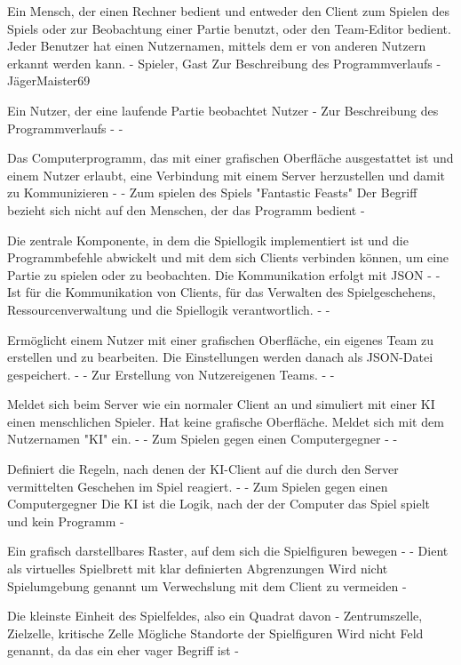 {Ein Mensch, der einen Rechner bedient und entweder den Client zum Spielen des Spiels oder zur Beobachtung einer Partie benutzt, oder den Team-Editor bedient. Jeder Benutzer hat einen Nutzernamen, mittels dem er von anderen Nutzern erkannt werden kann.}
{-}
{Spieler, Gast}
{Zur Beschreibung des Programmverlaufs}
{-}
{JägerMaister69}

{Ein Nutzer, der eine laufende Partie beobachtet}
{Nutzer}
{-}
{Zur Beschreibung des Programmverlaufs}
{-}
{-}

{Das Computerprogramm, das mit einer grafischen Oberfläche ausgestattet ist und einem Nutzer erlaubt, eine Verbindung mit einem Server herzustellen und damit zu Kommunizieren}
{-}
{-}
{Zum spielen des Spiels "Fantastic Feasts"}
{Der Begriff bezieht sich nicht auf den Menschen, der das Programm bedient}
{-}

{Die zentrale Komponente, in dem die Spiellogik implementiert ist und die Programmbefehle abwickelt und mit dem sich Clients verbinden können, um eine Partie zu spielen oder zu beobachten. Die Kommunikation erfolgt mit JSON}
{-}
{-}
{Ist für die Kommunikation von Clients, für das Verwalten des Spielgeschehens, Ressourcenverwaltung und die Spiellogik verantwortlich.}
{-}
{-}

{Ermöglicht einem Nutzer mit einer grafischen Oberfläche, ein eigenes Team zu erstellen und zu bearbeiten. Die Einstellungen werden danach als JSON-Datei gespeichert.}
{-}
{-}
{Zur Erstellung von Nutzereigenen Teams.}
{-}
{-}

{Meldet sich beim Server wie ein normaler Client an und simuliert mit einer KI einen menschlichen Spieler. Hat keine grafische Oberfläche. Meldet sich mit dem Nutzernamen "KI" ein.}
{-}
{-}
{Zum Spielen gegen einen Computergegner}
{-}
{-}

{Definiert die Regeln, nach denen der KI-Client auf die durch den Server vermittelten Geschehen im Spiel reagiert.}
{-}
{-}
{Zum Spielen gegen einen Computergegner}
{Die KI ist die Logik, nach der der Computer das Spiel spielt und kein Programm}
{-}

{Ein grafisch darstellbares Raster, auf dem sich die Spielfiguren bewegen}
{-}
{-}
{Dient als virtuelles Spielbrett mit klar definierten Abgrenzungen}
{Wird nicht Spielumgebung genannt um Verwechslung mit dem Client zu vermeiden}
{-}

{Die kleinste Einheit des Spielfeldes, also ein Quadrat davon}
{-}
{Zentrumszelle, Zielzelle, kritische Zelle}
{Mögliche Standorte der Spielfiguren}
{Wird nicht Feld genannt, da das ein eher vager Begriff ist}
{-}

